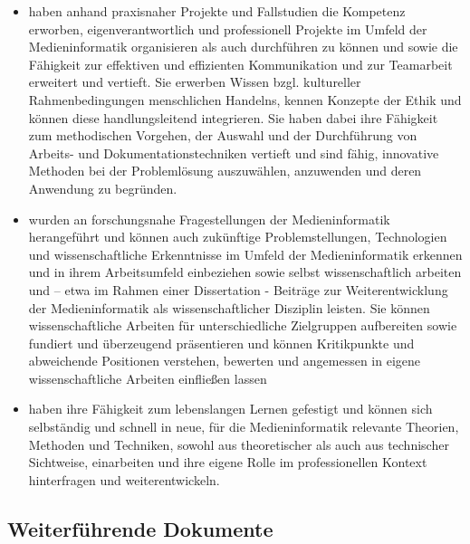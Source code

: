 \begin{itemize}
\item
  haben anhand praxisnaher Projekte und Fallstudien die Kompetenz
  erworben, eigenverantwortlich und professionell Projekte im Umfeld der
  Medieninformatik organisieren als auch durchführen zu können und sowie
  die Fähigkeit zur effektiven und effizienten Kommunikation und zur
  Teamarbeit erweitert und vertieft. Sie erwerben Wissen bzgl.
  kultureller Rahmenbedingungen menschlichen Handelns, kennen Konzepte
  der Ethik und können diese handlungsleitend integrieren. Sie haben
  dabei ihre Fähigkeit zum methodischen Vorgehen, der Auswahl und der
  Durchführung von Arbeits- und Dokumentationstechniken vertieft und
  sind fähig, innovative Methoden bei der Problemlösung auszuwählen,
  anzuwenden und deren Anwendung zu begründen.
\item
  wurden an forschungsnahe Fragestellungen der Medieninformatik
  herangeführt und können auch zukünftige Problemstellungen,
  Technologien und wissenschaftliche Erkenntnisse im Umfeld der
  Medieninformatik erkennen und in ihrem Arbeitsumfeld einbeziehen sowie
  selbst wissenschaftlich arbeiten und -- etwa im Rahmen einer
  Dissertation - Beiträge zur Weiterentwicklung der Medieninformatik als
  wissenschaftlicher Disziplin leisten. Sie können wissenschaftliche
  Arbeiten für unterschiedliche Zielgruppen aufbereiten sowie fundiert
  und überzeugend präsentieren und können Kritikpunkte und abweichende
  Positionen verstehen, bewerten und angemessen in eigene
  wissenschaftliche Arbeiten einfließen lassen
\item
  haben ihre Fähigkeit zum lebenslangen Lernen gefestigt und können sich
  selbständig und schnell in neue, für die Medieninformatik relevante
  Theorien, Methoden und Techniken, sowohl aus theoretischer als auch
  aus technischer Sichtweise, einarbeiten und ihre eigene Rolle im
  professionellen Kontext hinterfragen und weiterentwickeln.
\end{itemize}

\subsection{Weiterführende
Dokumente}\label{weiterfuxfchrende-dokumente-1}

